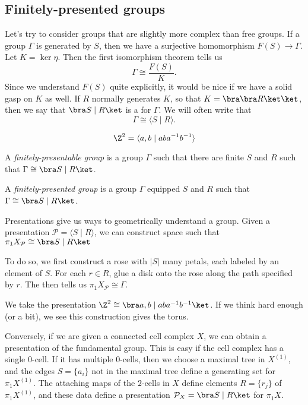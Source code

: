 \documentclass[a4paper]{article}
\begin{document}
\subsection{Finitely-presented groups}
Let's try to consider groups that are slightly more complex than free groups. If a group $\Gamma$ is generated by $S$, then we have a surjective homomorphism $F(S) \to \Gamma$. Let $K = \ker \eta$. Then the first isomorphism theorem tells us
\[
  \Gamma \cong \frac{F(S)}{K}.
\]
Since we understand $F(S)$ quite explicitly, it would be nice if we have a solid gasp on $K$ as well. If $R$ normally generates $K$, so that $K = \bra\bra R\ket\ket$, then we say that $\bra S \mid R \ket$ is a  for $\Gamma$. We will often write that
\[
  \Gamma \cong \langle S \mid R \rangle.
\]
\begin{eg}
  \[
    \Z^2 = \langle a, b\mid aba^{-1}b^{-1}\rangle
  \]
\end{eg}

\begin{defi}
  A \emph{finitely-presentable group} is a group $\Gamma$ such that there are finite $S$ and $R$ such that $\Gamma \cong \bra S \mid R\ket$.

  A \emph{finitely-presented group} is a group $\Gamma$ equipped $S$ and $R$ such that $\Gamma \cong \bra S \mid R \ket$.
\end{defi}

Presentations give us ways to geometrically understand a group. Given a presentation $\mathcal{P} = \langle S \mid R \rangle$, we can construct space  such that $\pi_1 X_\mathcal{P} \cong \bra S \mid R\ket$

To do so, we first construct a rose with $|S|$ many petals, each labeled by an element of $S$. For each $r \in R$, glue a disk onto the rose along the path specified by $r$. The  then tells us $\pi_1 X_{\mathcal{P}} \cong \Gamma$.

\begin{eg}
  We take the presentation $\Z^2 \cong \bra a, b \mid aba^{-1}b^{-1}\ket$. If we think hard enough (or a bit), we see this construction gives the torus.
\end{eg}

Conversely, if we are given a connected cell complex $X$, we can obtain a presentation of the fundamental group. This is easy if the cell complex has a single $0$-cell. If it has multiple $0$-cells, then we choose a maximal tree in $X^{(1)}$, and the edges $S = \{a_i\}$ not in the maximal tree define a generating set for $\pi_1 X^{(1)}$. The attaching maps of the $2$-cells in $X$ define elements $R = \{r_j\}$ of $\pi_1 X^{(1)}$, and these data define a presentation $\mathcal{P}_X = \bra S \mid R\ket$ for $\pi_1 X$.
\end{document}
